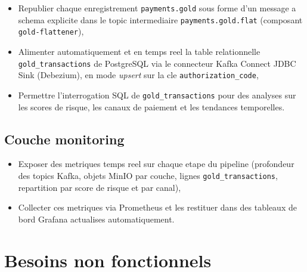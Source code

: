 \begin{itemize}
    \item Republier chaque enregistrement \texttt{payments.gold} sous forme d'un
    message a schema explicite dans le topic intermediaire
    \texttt{payments.gold.flat} (composant \texttt{gold-flattener}),
    \item Alimenter automatiquement et en temps reel la table relationnelle
    \texttt{gold\_transactions} de PostgreSQL via le connecteur Kafka Connect JDBC Sink
    (Debezium), en mode \textit{upsert} sur la cle \texttt{authorization\_code},
    \item Permettre l'interrogation SQL de \texttt{gold\_transactions} pour des
    analyses sur les scores de risque, les canaux de paiement et les tendances
    temporelles.
\end{itemize}

\subsection{Couche monitoring}

\begin{itemize}
    \item Exposer des metriques temps reel sur chaque etape du pipeline (profondeur
    des topics Kafka, objets MinIO par couche, lignes \texttt{gold\_transactions},
    repartition par score de risque et par canal),
    \item Collecter ces metriques via Prometheus et les restituer dans des tableaux
    de bord Grafana actualises automatiquement.
\end{itemize}

\section{Besoins non fonctionnels}
\label{sec:besoins-nonfonc}


